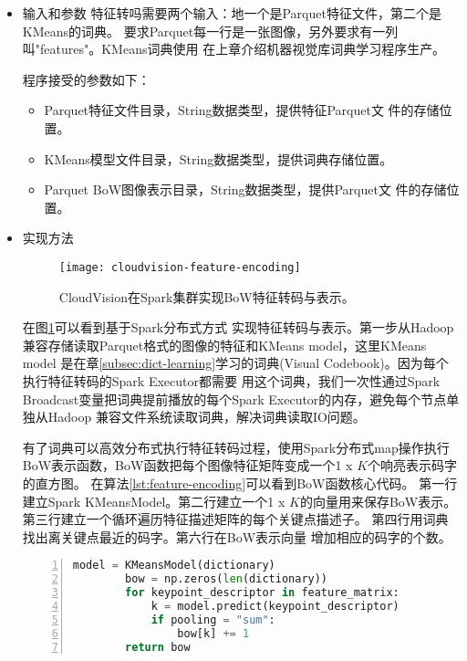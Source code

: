 \begin{itemize}
  \item 输入和参数 
        特征转吗需要两个输入：地一个是Parquet特征文件，第二个是KMeans的词典。
        要求Parquet每一行是一张图像，另外要求有一列叫"features"。KMeans词典使用
        在上章介绍机器视觉库词典学习程序生产。

        程序接受的参数如下：
        \begin{itemize}
          \item Parquet特征文件目录，String数据类型，提供特征Parquet文
                件的存储位置。
          \item KMeans模型文件目录，String数据类型，提供词典存储位置。
          \item Parquet BoW图像表示目录，String数据类型，提供Parquet文
                件的存储位置。
        \end{itemize}
  \item 实现方法

       \begin{figure}[h]
          \centering
            \texttt{[image: cloudvision-feature-encoding]}
          \caption{CloudVision在Spark集群实现BoW特征转码与表示。}
          \label{fig:cloudvision-feature-encoding}
        \end{figure}
        在图\ref{fig:cloudvision-feature-encoding}可以看到基于Spark分布式方式
        实现特征转码与表示。第一步从Hadoop兼容存储读取Parquet格式的图像的特征和KMeans model，这里KMeans model
        是在章\ref{subsec:dict-learning}学习的词典(Visual Codebook)。因为每个执行特征转码的Spark Executor都需要
        用这个词典，我们一次性通过Spark Broadcast变量把词典提前播放的每个Spark Executor的内存，避免每个节点单独从Hadoop
        兼容文件系统读取词典，解决词典读取IO问题。\cite{spark-programming-guide}

        有了词典可以高效分布式执行特征转码过程，使用Spark分布式map操作执行
        BoW表示函数，BoW函数把每个图像特征矩阵变成一个1 x $K$个响亮表示码字的直方图。
        在算法\ref{lst:feature-encoding}可以看到BoW函数核心代码。
        第一行建立Spark KMeansModel。第二行建立一个1 x $K$的向量用来保存BoW表示。
        第三行建立一个循环遍历特征描述矩阵的每个关键点描述子。
        第四行用词典找出离关键点最近的码字。第六行在BoW表示向量
        增加相应的码字的个数。
        \begin{minipage}{\textwidth}
        \begin{lstlisting}[language=Python,
                           basicstyle=\small,
                           numbers=left,
                           showstringspaces=false,
                           caption={BoW特征转码核心代码},
                           label={lst:feature-encoding}]
        model = KMeansModel(dictionary)
        bow = np.zeros(len(dictionary))
        for keypoint_descriptor in feature_matrix:
            k = model.predict(keypoint_descriptor)
            if pooling = "sum":
                bow[k] += 1
        return bow
        \end{lstlisting}
        \end{minipage}


\end{itemize}
